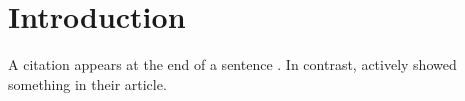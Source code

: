 \section{Introduction}


A citation appears at the end of a sentence \cite{harley_use_2006}.
In contrast,  actively showed something in their article.
